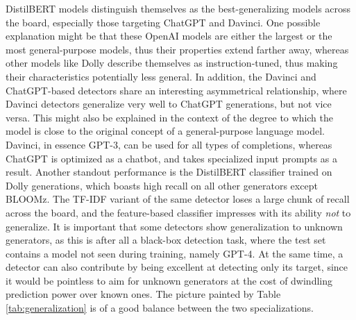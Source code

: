DistilBERT models distinguish themselves as the best-generalizing models across the board, especially those targeting ChatGPT and Davinci.
One possible explanation might be that these OpenAI models are either the largest or the most general-purpose models, thus their properties extend farther away, whereas other models like Dolly describe themselves as instruction-tuned, thus making their characteristics potentially less general.
In addition, the Davinci and ChatGPT-based detectors share an interesting asymmetrical relationship, where Davinci detectors generalize very well to ChatGPT generations, but not vice versa.
This might also be explained in the context of the degree to which the model is close to the original concept of a general-purpose language model.
Davinci, in essence GPT-3, can be used for all types of completions, whereas ChatGPT is optimized as a chatbot, and takes specialized input prompts as a result.
Another standout performance is the DistilBERT classifier trained on Dolly generations, which boasts high recall on all other generators except BLOOMz.
The TF-IDF variant of the same detector loses a large chunk of recall across the board, and the feature-based classifier impresses with its ability \emph{not} to generalize.
It is important that some detectors show generalization to unknown generators, as this is after all a black-box detection task, where the test set contains a model not seen during training, namely GPT-4.
At the same time, a detector can also contribute by being excellent at detecting only its target, since it would be pointless to aim for unknown generators at the cost of dwindling prediction power over known ones.
The picture painted by Table \ref{tab:generalization} is of a good balance between the two specializations.

